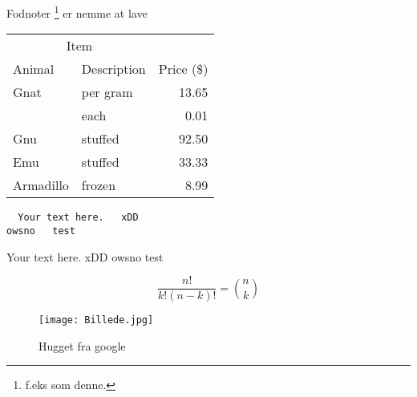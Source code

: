 \documentclass[a4paper]{article}
\begin{document}
Fodnoter \footnote{f.eks som denne.}
er nemme at lave

\bigbreak

\begin{tabular}{llr}
\hline
\multicolumn{2}{c}{Item} \\
\cline{1-2}
Animal    & Description & Price (\$)   \\
\hline
Gnat        	& per gram  & 13.65        \\
              	& each        & 0.01   	      \\
Gnu         	& stuffed     & 92.50         \\
Emu        	& stuffed     & 33.33         \\
Armadillo	& frozen      & 8.99           \\
\hline
\end{tabular}

\begin{verbatim}
  Your text here. 	xDD
owsno	test
\end{verbatim}

  Your text here. 	xDD
owsno	test

\[ \frac{n!}{k!(n-k)!} = \binom{n}{k} \]

\begin{figure}
  \caption{Hugget fra google}
  \centering
    \texttt{[image: Billede.jpg]}
\end{figure}
\end{document}

